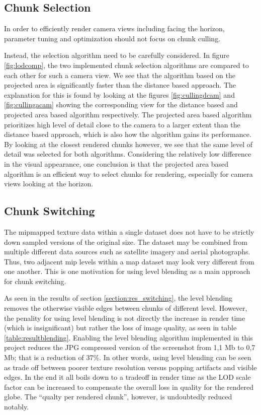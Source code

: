 \subsection{Chunk Selection}
\label{section:chunkselection}
In order to efficiently render camera views including facing the horizon, parameter tuning and optimization should not focus on chunk culling. 

Instead, the selection algorithm need to be carefully considered. 
In figure \ref{fig:lodcomp}, the two implemented chunk selection algorithms are compared to each other for such a camera view. 
We see that the algorithm based on the projected area is significantly faster than the distance based approach. 
The explanation for this is found by looking at the figures \ref{fig:cullingdcam} and \ref{fig:cullingacam} showing the corresponding view for the distance based and projected area based algorithm respectively. 
The projected area based algorithm prioritizes high level of detail close to the camera to a larger extent than the distance based approach, which is also how the algorithm gains its performance. 
By looking at the closest rendered chunks however, we see that the same level of detail was selected for both algorithms. 
Considering the relatively low difference in the visual appearance, one conclusion is that the projected area based algorithm is an efficient way to select chunks for rendering, especially for camera views looking at the horizon.

\subsection{Chunk Switching}
The mipmapped texture data within a single dataset does not have to be strictly down sampled versions of the original size. 
The dataset may be combined from multiple different data sources such as satellite imagery and aerial photographs. 
Thus, two adjacent mip levels within a map dataset may look very different from one another. This is one motivation for using level blending as a main approach for chunk switching.

As seen in the results of section \ref{section:res_switching}, the level blending removes the otherwise visible edges between chunks of different level. However, the penality for using level blending is not directly the increase in render time (which is insignificant) but rather the loss of image quality, as seen in table \ref{table:resultblending}. Enabling the level blending algorithm implemented in this project reduces the JPG compressed version of the screenshot from 1,1 Mb to 0,7 Mb; that is a reduction of 37\%. In other words, using level blending can be seen as trade off between poorer texture resolution versus popping artifacts and visible edges. In the end it all boils down to a tradeoff in render time as the LOD scale factor can be increased to compensate the overall loss in quality for the rendered globe. The ``qualty per rendered chunk'', however, is undoubtedly reduced notably.


